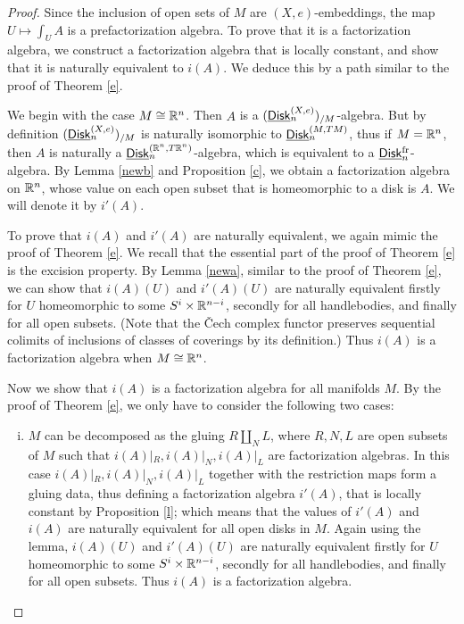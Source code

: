 \documentclass[twoside]{article}
\begin{document}
\begin{proof}
    Since the inclusion of open sets of $M$ are 
    $(X,e)$-embeddings, the map $U\mapsto\int_UA$ is 
    a prefactorization algebra. To prove that it is a factorization algebra, we 
    construct a factorization algebra that is locally constant, and show that
    it is naturally equivalent to $i(A)$. We deduce this by a path similar to the
    proof of Theorem \ref{e}.

    We begin with the case $M\cong\mathbb{R}^n$. Then $A$ is a
    $(\underline{\smash{\mathsf{Disk}}}_n^{(X,e)})_{/M}$-algebra. But by definition $(\underline{\smash{\mathsf{Disk}}}_n^{(X,e)})_{/M}$
    is naturally isomorphic to $\underline{\smash{\mathsf{Disk}}}_n^{(M,TM)}$, thus if $M=\mathbb{R}^n$, then $A$ is
    naturally a $\underline{\smash{\mathsf{Disk}}}_n^{(\mathbb{R}^n,T\mathbb{R}^n)}$-algebra, which is equivalent to a
    $\underline{\smash{\mathsf{Disk}}}_n^{\mathrm{fr}}$-algebra. By Lemma \ref{newb} and Proposition \ref{c}, we obtain
    a factorization algebra on $\mathbb{R}^n$, whose value on each open subset that is
    homeomorphic to a disk is $A$. We will denote it by $i'(A)$. 

    To prove that $i(A)$ and $i'(A)$ are naturally equivalent, we again mimic
    the proof of Theorem \ref{e}. We recall that the essential part of the proof
    of Theorem \ref{e} is the excision property. By Lemma \ref{newa},
    similar to the proof of Theorem \ref{e}, we can show
    that $i(A)(U)$ and $i'(A)(U)$ are naturally equivalent firstly for $U$
    homeomorphic to some $S^i\times\mathbb{R}^{n-i}$, secondly for all handlebodies,
    and finally for all open subsets. (Note that the \v{C}ech complex functor
    preserves sequential colimits of inclusions of classes of coverings
    by its definition.) Thus $i(A)$ is a factorization algebra when $M\cong\mathbb{R}^n$.

    Now we show that $i(A)$ is a factorization algebra for all manifolds $M$.
    By the proof of Theorem \ref{e}, we only have to consider the
    following two cases:

    \begin{enumerate}[i)]
        \item $M$ can be decomposed as the gluing $R\amalg_{N}L$, where $R,N,L$ are
        open subsets of $M$ such that $i(A)|_R,i(A)|_N,i(A)|_L$ are
        factorization algebras. In this case $i(A)|_R,i(A)|_N,i(A)|_L$ together with
        the restriction maps form a gluing data, thus defining a factorization algebra
        $i'(A)$, that is locally constant by Proposition \ref{l}; which means that
        the values of $i'(A)$ and $i(A)$ are naturally equivalent for all open disks
        in $M$. Again using the lemma, $i(A)(U)$ and $i'(A)(U)$ are naturally equivalent
        firstly for $U$ homeomorphic to some $S^i\times\mathbb{R}^{n-i}$, secondly for
        all handlebodies, and finally for all open subsets. Thus $i(A)$ is a
        factorization algebra.


\end{enumerate}
\end{proof}
\end{document}

